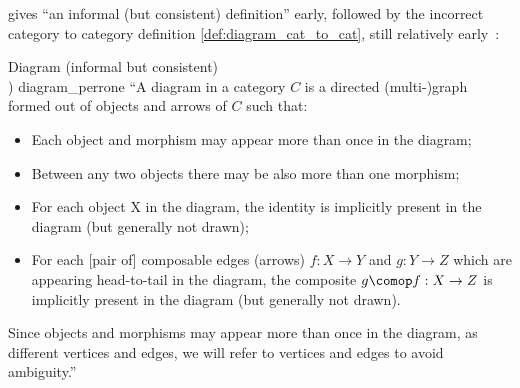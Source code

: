 \documentclass[11pt,openany]{book}
\begin{document}
\textcite[p$18/181$]{perrone_2019_cath_notes}
gives ``an informal (but consistent) definition'' early,
followed by the incorrect category to
category definition \ref{def:diagram_cat_to_cat}, still relatively 
early~\cite[p$53/181$]{perrone_2019_cath_notes}:

\begin{tcbdefinition}{Diagram (informal but consistent)\\
 \textmd{{\textcite[Definition 1.1.33]{perrone_2019_cath_notes}}})}
{diagram_perrone}
``A diagram in a category $C$ is a directed (multi-)graph formed 
out of objects and arrows of $C$ such that:
\begin{itemize}
\item Each object and morphism 
may appear more than once in the diagram;
\item Between any two objects 
there may be also more than one morphism;
\item For each object X in the diagram, 
the identity is implicitly present in the diagram (but generally
not drawn);
\item For each {[pair of]} composable edges 
(arrows) $f : X \rightarrow Y$ and $g : Y \rightarrow Z$
which are appearing head-to-tail
in the diagram, the composite $g\comop f : X \rightarrow Z$
 is implicitly present in the diagram (but generally
not drawn).
\end{itemize}
Since objects and morphisms may appear 
more than once in the diagram, as different vertices
and edges, we will refer to vertices and edges to avoid ambiguity.''
\end{tcbdefinition}
\end{document}
